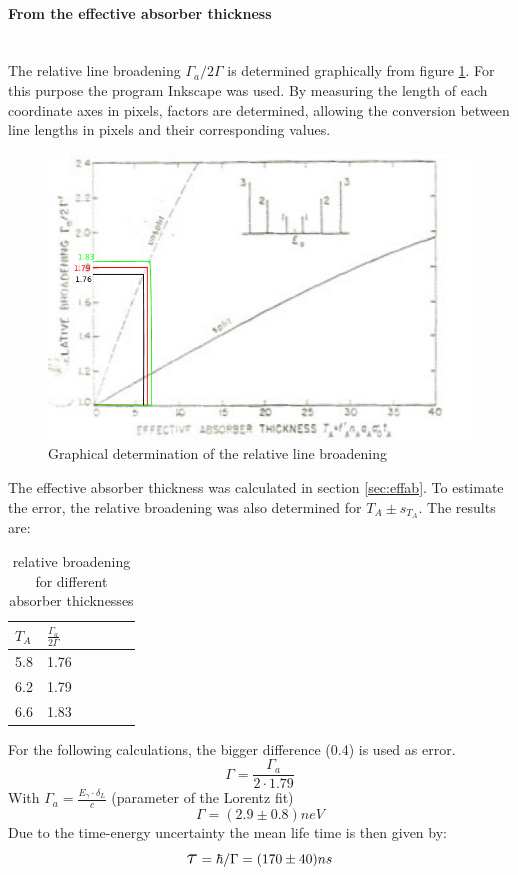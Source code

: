 \paragraph{From the effective absorber thickness} \ \\
The relative line broadening $\Gamma_a/2\Gamma$ is determined graphically from figure \ref{fig:absorberthicknessevaluated}. For this purpose the program Inkscape was used. By measuring the length of each coordinate axes in pixels, factors are determined, allowing the conversion between line lengths in pixels and their corresponding values.\\
\begin{figure}[hbp]
	\centering
	\includegraphics[width=1.0\linewidth]{graphics/absorberthicknessevaluated}
	\caption{Graphical determination of the relative line broadening\cite{Frauenfelder}}
	\label{fig:absorberthicknessevaluated}
\end{figure}
The effective absorber thickness was calculated in section \ref{sec:effab}. To estimate the error, the relative broadening was also determined for $T_A\pm s_{T_A}$. The results are:
\begin{table}[H]\centering
	\begin{tabular}{@{}llllll@{}}
		\toprule
		$T_A$ & $\frac{\Gamma_a}{2\Gamma}$ \\
		\midrule
		5.8 & 1.76\\
		6.2 & 1.79 \\
		6.6 & 1.83 \\
	\end{tabular}
	\caption[relative broadening]{relative broadening for different absorber thicknesses}
	\label{tb:relative broadening}
\end{table}
For the following calculations, the bigger difference (0.4) is used as error.
\begin{equation}
\Gamma = \frac{\Gamma_a}{2\cdot1.79}
\end{equation}
With $\Gamma_a=\frac{E_\gamma\cdot\delta_L}{c} $ (parameter of the Lorentz fit)
\begin{equation}
\Gamma=\unit{(2.9\pm0.8)}{neV}
\end{equation}
Due to the time-energy uncertainty the mean life time is then given by:
\begin{equation}
\scalebox{1.5}{$\tau$}=\hbar/\Gamma=\unit{(170\pm40)}{ns}
\end{equation}